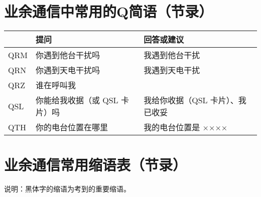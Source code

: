 \newpage

\section{业余通信中常用的Q简语（节录）}

\begin{longtable}{|l|l|l|}
	\hline
	    & \textbf{提问} & \textbf{回答或建议} \\
	\hline
	QRM & 你遇到他台干扰吗 & 我遇到他台干扰 \\
	\hline
	QRN & 你遇到天电干扰吗 & 我遇到天电干扰 \\
	\hline
	QRZ & 谁在呼叫我 & \\
	\hline
	QSL & 你能给我收据（或 QSL 卡片）吗 & 我给你收据（QSL 卡片）、我已收妥 \\
	\hline
	QTH & 你的电台位置在哪里 & 我的电台位置是 ×××× \\
	\hline
\end{longtable}

\newpage



\section{业余通信常用缩语表（节录）}

说明：黑体字的缩语为考到的重要缩语。


